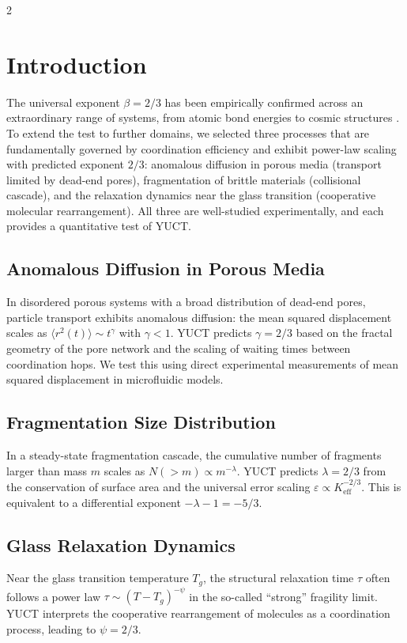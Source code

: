 \documentclass[11pt,a4paper]{article}
\newcommand{\eps}{\varepsilon}
\newcommand{\Keff}{K_{\mathrm{eff}}}
\newcommand{\betaf}{\beta}
\begin{document}
	\vspace{0.4cm}
	\vspace*{-\baselineskip}
	\begin{multicols}{2}
		
		\section{Introduction}
		
		The universal exponent \(\betaf = 2/3\) has been empirically confirmed across an extraordinary range of systems, from atomic bond energies to cosmic structures \cite{AppendixY, AppendixL, AppendixC, AppendixG}. To extend the test to further domains, we selected three processes that are fundamentally governed by coordination efficiency and exhibit power-law scaling with predicted exponent \(2/3\): anomalous diffusion in porous media (transport limited by dead-end pores), fragmentation of brittle materials (collisional cascade), and the relaxation dynamics near the glass transition (cooperative molecular rearrangement). All three are well-studied experimentally, and each provides a quantitative test of YUCT.
		
		\subsection{Anomalous Diffusion in Porous Media}
		In disordered porous systems with a broad distribution of dead-end pores, particle transport exhibits anomalous diffusion: the mean squared displacement scales as \(\langle r^2(t) \rangle \sim t^{\gamma}\) with \(\gamma < 1\). YUCT predicts \(\gamma = 2/3\) based on the fractal geometry of the pore network and the scaling of waiting times between coordination hops. We test this using direct experimental measurements of mean squared displacement in microfluidic models.
		
		\subsection{Fragmentation Size Distribution}
		In a steady-state fragmentation cascade, the cumulative number of fragments larger than mass \(m\) scales as \(N(>m) \propto m^{-\lambda}\). YUCT predicts \(\lambda = 2/3\) from the conservation of surface area and the universal error scaling \(\eps \propto \Keff^{-2/3}\). This is equivalent to a differential exponent \(-\lambda - 1 = -5/3\).
		
		\subsection{Glass Relaxation Dynamics}
		Near the glass transition temperature \(T_g\), the structural relaxation time \(\tau\) often follows a power law \(\tau \sim (T - T_g)^{-\psi}\) in the so-called “strong” fragility limit. YUCT interprets the cooperative rearrangement of molecules as a coordination process, leading to \(\psi = 2/3\).
		

\end{multicols}
\end{document}
